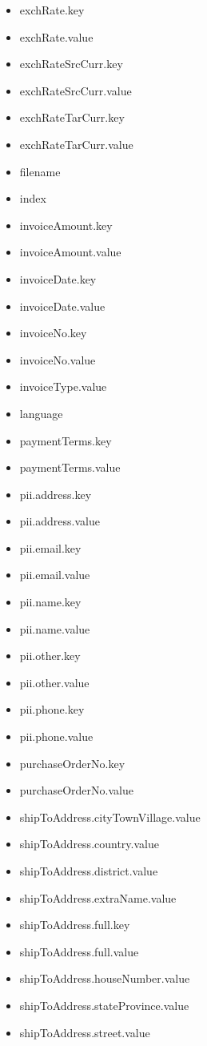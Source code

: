 \begin{multicols}{2}
\begin{itemize}
\item[] exchRate.key
\item[] exchRate.value
\item[] exchRateSrcCurr.key
\item[] exchRateSrcCurr.value
\item[] exchRateTarCurr.key
\item[] exchRateTarCurr.value
\item[] filename
\item[] index
\item[] invoiceAmount.key
\item[] invoiceAmount.value
\item[] invoiceDate.key
\item[] invoiceDate.value
\item[] invoiceNo.key
\item[] invoiceNo.value
\item[] invoiceType.value
\item[] language
\item[] paymentTerms.key
\item[] paymentTerms.value
\item[] pii.address.key
\item[] pii.address.value
\item[] pii.email.key
\item[] pii.email.value
\item[] pii.name.key
\item[] pii.name.value
\item[] pii.other.key
\item[] pii.other.value
\item[] pii.phone.key
\item[] pii.phone.value
\item[] purchaseOrderNo.key
\item[] purchaseOrderNo.value
\item[] shipToAddress.cityTownVillage.value
\item[] shipToAddress.country.value
\item[] shipToAddress.district.value
\item[] shipToAddress.extraName.value
\item[] shipToAddress.full.key
\item[] shipToAddress.full.value
\item[] shipToAddress.houseNumber.value
\item[] shipToAddress.stateProvince.value
\item[] shipToAddress.street.value

\end{itemize}
\end{multicols}
